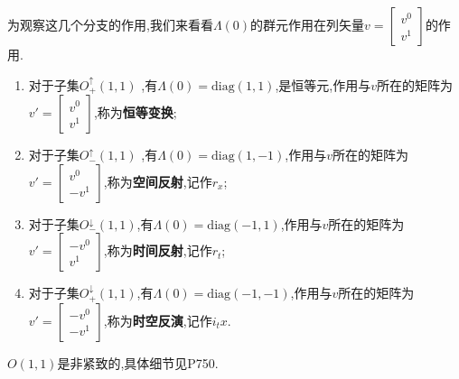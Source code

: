 \documentclass[../main.tex]{subfiles}
\begin{document}
 为观察这几个分支的作用,我们来看看$\Lambda(0)$的群元作用在列矢量$v = \begin{bmatrix}v^0\\v^1\end{bmatrix}$的作用.
 \begin{enumerate}
     \item 对于子集$O^\uparrow_+(1,1)$  ,有$\Lambda(0) =\text{diag}(1,1)$,是恒等元,作用与$v$所在的矩阵为$v'=\begin{bmatrix}v^0\\v^1 \end{bmatrix}$,称为\textbf{恒等变换};
     \item 对于子集$O^\uparrow_-(1,1)$  ,有$\Lambda(0) =\text{diag}(1,-1) $,作用与$v$所在的矩阵为$v'=\begin{bmatrix}v^0\\-v^1\end{bmatrix}$,称为\textbf{空间反射},记作$r_x$;
     \item 对于子集$O^\downarrow_-(1,1)$,有$\Lambda(0) =\text{diag}(-1,1) $,作用与$v$所在的矩阵为$v'=\begin{bmatrix}-v^0\\v^1\end{bmatrix}$,称为\textbf{时间反射},记作$r_t$;
     \item 对于子集$O^\downarrow_+(1,1)$,有$\Lambda(0) =\text{diag}(-1,-1) $,作用与$v$所在的矩阵为$v'=\begin{bmatrix}-v^0\\-v^1\end{bmatrix}$,称为\textbf{时空反演},记作$i_tx$.
 \end{enumerate}
 $O(1,1)$是非紧致的,具体细节见P750.
\end{document}
